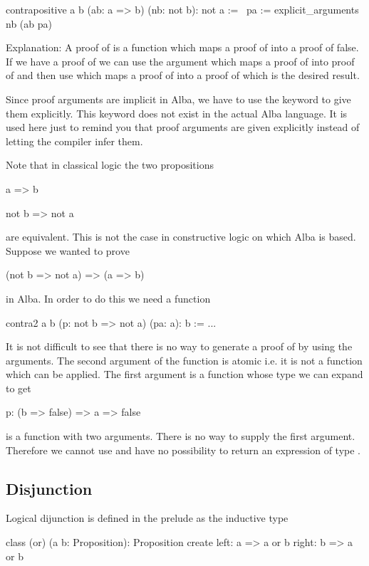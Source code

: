 \begin{alba}
  contrapositive a b (ab: a => b) (nb: not b): not a :=
    \ pa :=
        explicit_arguments
          nb (ab pa)
\end{alba}

\noindent Explanation: A proof of  is a function which maps a
proof of  into a proof of false. If we have a proof of  we can
use the argument  which maps a proof of  into proof of
 and then use  which maps a proof of  into a proof of
 which is the desired result.

Since proof arguments are implicit in Alba, we have to use the keyword
 to give them explicitly. This keyword does not
exist in the actual Alba language. It is used here just to remind you that
proof arguments are given explicitly instead of letting the compiler infer
them.


Note that in classical logic the two propositions
\begin{alba}
  a  =>  b

  not b => not a
\end{alba}
%
are equivalent. This is not the case in constructive logic on which Alba is
based. Suppose we wanted to prove
%
\begin{alba}
  (not b => not a) => (a => b)
\end{alba}
%
in Alba. In order to do this we need a function
\begin{alba}
  contra2 a b (p: not b => not a) (pa: a): b :=
     ...
\end{alba}
%
It is not difficult to see that there is no way to generate a proof of 
by using the arguments. The second argument of the function is atomic i.e. it
is not a function which can be applied. The first argument is a function whose
type we can expand to get
\begin{alba}
  p: (b => false) => a => false
\end{alba}
%
 is a function with two arguments. There is no way to supply the first
argument. Therefore we cannot use  and have no possibility to return
an expression of type .


\subsection{Disjunction}

Logical dijunction is defined in the prelude as the inductive type
%
\begin{alba}
  class
    (or) (a b: Proposition): Proposition
  create
    left:  a => a or b
    right: b => a or b
\end{alba}


